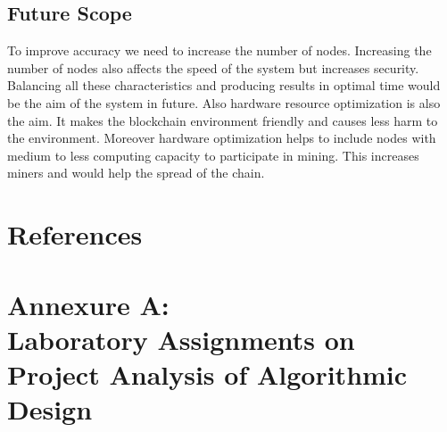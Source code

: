 \documentclass[oneside, 12pt]{book}
\begin{document}
		\subsection{Future Scope}
			To improve accuracy we need to increase the number of nodes. Increasing the number of nodes also affects the speed of the system but increases security. Balancing all these characteristics and producing results in optimal time would be the aim of the system in future. Also hardware resource optimization is also the aim. It makes the blockchain environment friendly and causes less harm to the environment. Moreover hardware optimization helps to include nodes with medium to less computing capacity to participate in mining. This increases miners and  would help the spread of the chain.
	\newpage
	\section{References}
	\newpage
		
		
	\newpage
	\section{Annexure A:\\Laboratory Assignments on Project Analysis of Algorithmic Design}
	\newpage
\end{document}
